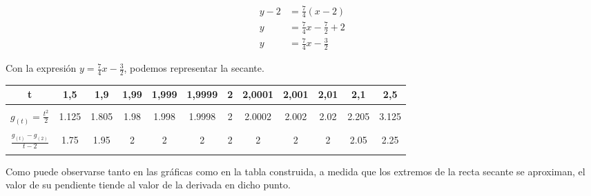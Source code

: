 \begin{align*}
    y-2 & = \frac{7}{4}(x-2)               \\
    y   & = \frac{7}{4}x - \frac{7}{2} + 2 \\
    y   & = \frac{7}{4}x - \frac{3}{2}
\end{align*}

Con la expresión $y = \frac{7}{4}x - \frac{3}{2}$, podemos representar la secante.

\begin{center}
\end{center}

\begin{center}
    \begin{tabular}{ c c c c c c c c c c c c }
        t                             & 1,5   & 1,9   & 1,99 & 1,999 & 1,9999 & 2 & 2,0001 & 2,001 & 2,01 & 2,1   & 2,5   \\
        \hline                        &                                                                                   \\ [-1em]
        $g_{(t)} = \frac{t^2}{2}$     & 1.125 & 1.805 & 1.98 & 1.998 & 1.9998 & 2 & 2.0002 & 2.002 & 2.02 & 2.205 & 3.125 \\
        \vspace{10pt}                                                                                                     \\
        $\frac{g_(t) - g_(2)}{t - 2}$ & 1.75  & 1.95  & 2    & 2     & 2      & 2 & 2      & 2     & 2    & 2.05  & 2.25  \\                                                                                                  \\
        \hline
    \end{tabular}
\end{center}

Como puede observarse tanto en las gráficas como en la tabla construida, a medida que los extremos de la recta secante se aproximan, el valor de su pendiente tiende al valor de la derivada en dicho punto.
